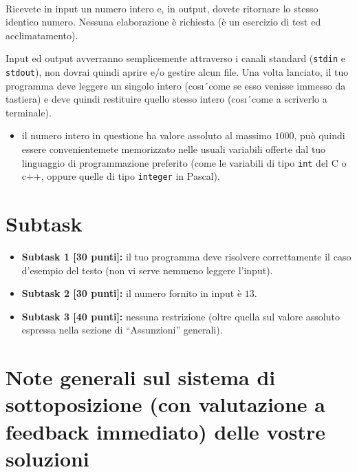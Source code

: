 \renewcommand{\nomebreve}{io\_std}
\renewcommand{\titolo}{Ricevere input ed erogare output sui canali standard}

\mbox{\ }
\vspace{-1.9cm}

\introduzione{}

Ricevete in input un numero intero e,
in output, dovete ritornare lo stesso identico numero. Nessuna elaborazione \`e richiesta (\`e un esercizio di test ed acclimatamento).

Input ed output avverranno semplicemente attraverso i canali standard (\texttt{stdin} e \texttt{stdout}), non dovrai quindi aprire e/o gestire alcun file.
Una volta lanciato, il tuo programma deve leggere un singolo intero (cos\i\'\ come se esso venisse immesso da tastiera) e deve quindi restituire quello stesso intero (cos\i\'\ come a scriverlo a terminale).

   

\begin{itemize}[nolistsep, noitemsep]
  \item il numero intero in questione ha valore assoluto al massimo $1000$,
        pu\`o quindi essere convenientemete memorizzato nelle usuali variabili offerte dal tuo linguaggio di programmazione preferito (come le variabili di tipo \texttt{int} del C o c++, oppure quelle di tipo \texttt{integer} in Pascal).
\end{itemize}
  
  \section*{Subtask}
  \begin{itemize}
    \item \textbf{Subtask 1 [30 punti]:} il tuo programma deve risolvere correttamente il caso d'esempio del testo (non vi serve nemmeno leggere l'input).
    \item \textbf{Subtask 2 [30 punti]:} il numero fornito in input \`e $13$.
    \item \textbf{Subtask 3 [40 punti]:} nessuna restrizione (oltre quella sul valore assoluto espressa nella sezione di ``Assunzioni'' generali).
  \end{itemize}


  \section*{Note generali sul sistema di sottoposizione (con valutazione a feedback immediato) delle vostre soluzioni}

